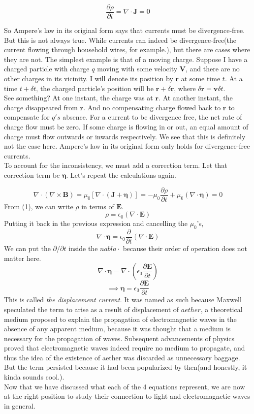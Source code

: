 \documentclass[12pt]{article}
\begin{document}
\[\frac{\partial \rho}{\partial t}=\nabla\cdot\mathbf{J}=0\]

So Ampere's law in its original form says that currents must be divergence-free. But this is not always true. 
While currents can indeed be divergence-free(the current flowing through household wires, for example.), but there are cases 
where they are not. The simplest example is that of a moving charge. Suppose I have a charged particle with charge $q$ moving with some 
velocity $\mathbf{V}$, and there are no other charges in its vicinity. I will denote its position by $\mathbf{r}$ at some time $t$. 
At a time $t+\delta t$, the charged particle's position will be $\mathbf{r}+\delta\mathbf{r}$, where $\delta\mathbf{r}=\mathbf{v}\delta t$. \\
See something? At one instant, the charge was at $\mathbf{r}$. At another instant, the charge disappeared from $\mathbf{r}$. And no compensating charge flowed back to $\mathbf{r}$ 
to compensate for $q's$ absence. For a current to be divergence free, the net rate of charge flow must be zero. If some charge is flowing in or out, an equal amount of charge must flow outwards or inwards respectively. We see 
that this is definitely not the case here. Ampere's law in its original form only holds for divergence-free currents. \\
To account for the inconsistency, we must add a correction term. Let that correction term be $\mathbf{\eta}$. Let's repeat the calculations again. 

\[\nabla \cdot(\nabla \times \mathbf{B})=\mu_0[\nabla\cdot (\mathbf{J}+\mathbf{\eta})]=-\mu_0\frac{\partial \rho}{\partial t}+\mu_0 (\nabla\cdot\mathbf{\eta})=0\]
From (1), we can write $\rho$ in terms of $\mathbf{E}$.
\[\rho = \epsilon_0(\nabla\cdot\mathbf{E})\]
Putting it back in the previous expression and cancelling the $\mu_0$'s,
\[\nabla\cdot\mathbf{\eta}=\epsilon_0 \frac{\partial}{\partial t}(\nabla\cdot{\mathbf{E}})\]
We can put the $\partial/\partial t$ inside the $nabla\cdot$ because their order of operation does not matter here. 
\[\nabla\cdot\mathbf{\eta}=\nabla\cdot\left(\epsilon_0\frac{\partial\mathbf{E}}{\partial t}\right)\]
\[\implies \mathbf{\eta} = \epsilon_0\frac{\partial \mathbf{E}}{\partial t}\]
This is called \textit{the displacement current}. It was named as such because Maxwell speculated the term to arise as a 
result of displacement of $aether$, a theoretical medium proposed to explain the propagation of electromagnetic waves in the absence of any apparent medium, because it was thought that a medium is necessary for the propagation of waves. Subsequent advancements of physics 
proved that electromagnetic waves indeed require no medium to propagate, and thus the idea of the existence of aether was discarded as unnecessary baggage. 
But the term persisted because it had been popularized by then(and honestly, it kinda sounds cool.).\\ 
Now that we have discussed what each of the 4 equations represent, we are now at the right position to study their connection to light and electromagnetic waves in general.  
\end{document}
